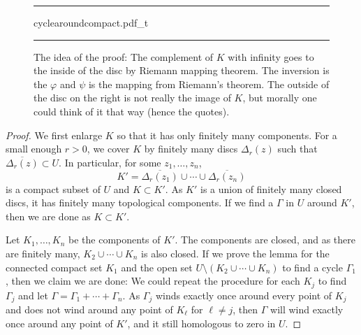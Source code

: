 \documentclass[12pt,openany]{book}
\theoremstyle{plain}
\theoremstyle{remark}
\theoremstyle{definition}
\newenvironment{myfig}{%
\begin{figure}[h!t]
\noindent\rule{\textwidth}{0.5pt}\vspace{12pt}\par\centering}%
{\par\noindent\rule{\textwidth}{0.5pt}
\end{figure}}
\theoremstyle{exercise}
\theoremstyle{example}
\begin{document}
\begin{myfig}
{cyclearoundcompact.pdf_t}
\caption{The idea of the proof: The complement of $K$ with infinity goes to
the inside of the disc by Riemann mapping theorem.  The inversion is the
$\varphi$ and $\psi$ is the mapping from Riemann's theorem.
The outside of the disc on the right is not really the image of $K$, but
morally one could think of it that way (hence the quotes).\label{fig:cyclearoundcompact}}
\end{myfig}

\begin{proof}
We first enlarge $K$ so that it
has only finitely many components.  For a small enough $r > 0$, we cover
$K$ by finitely many discs $\Delta_r(z)$ such that $\overline{\Delta_r(z)}
\subset U$.  In particular, for some $z_1,\ldots,z_n$,
\begin{equation*}
K' =
\overline{\Delta_r(z_1)}
\cup \cdots \cup
\overline{\Delta_r(z_n)}
\end{equation*}
is a compact subset of $U$ and $K \subset K'$.
As $K'$ is a union of finitely many closed discs, it has
finitely many topological components.
If we find a $\Gamma$ in $U$ around $K'$, then we are done as $K \subset K'$.

Let $K_1,\ldots,K_n$ be the components of $K'$.
The components are closed, and as there are finitely many,
$K_2 \cup \cdots \cup K_n$ is also closed.
If we prove the lemma for the connected compact set $K_1$ and
the open set $U \setminus ( K_2 \cup \cdots \cup K_n )$ to find a cycle
$\Gamma_1$, then we claim we are done: We could repeat the procedure
for each $K_j$ to find $\Gamma_j$ and let $\Gamma = \Gamma_1 + \cdots +
\Gamma_n$.  As $\Gamma_j$ winds exactly once around every point of $K_j$
and does not wind around any point of $K_\ell$ for $\ell \not= j$,
then $\Gamma$ will wind exactly once around any point of $K'$,
and it still homologous to zero in $U$.


\end{proof}
\end{document}
